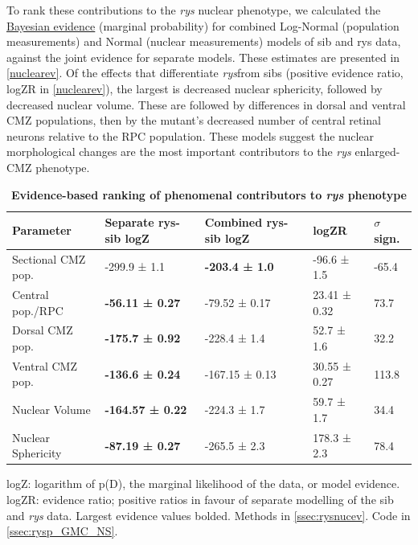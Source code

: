 \documentclass{ut-thesis}
\begin{document}
\begin{NoHyper}
To rank these contributions to the \textit{rys} nuclear phenotype, we calculated the \hyperref[ssec:BayesEpistemology]{Bayesian evidence} (marginal probability) for combined Log-Normal (population measurements) and Normal (nuclear measurements) models of sib and rys data, against the joint evidence for separate models. These estimates are presented in \autoref{nuclearev}. Of the effects that differentiate \textit{rys}from sibs (positive evidence ratio, logZR in \autoref{nuclearev}), the largest is decreased nuclear sphericity, followed by decreased nuclear volume. These are followed by differences in dorsal and ventral CMZ populations, then by the mutant's decreased number of central retinal neurons relative to the RPC population. These models suggest the nuclear morphological changes are the most important contributors to the \textit{rys} enlarged-CMZ phenotype.

\begin{table}[!ht]
    \centering
    \caption{{\bf Evidence-based ranking of phenomenal contributors to \textit{rys} phenotype}}
    \begin{tabular}{|l|l|l|l|l|} 
        \hline {\bf Parameter} & {\bf Separate rys-sib logZ} & {\bf Combined rys-sib logZ} & {\bf logZR} & {\bf $\sigma$ sign.}\\ \hline 
        Sectional CMZ pop. & -299.9 ± 1.1 & {\bf -203.4 ± 1.0} & -96.6 ± 1.5 & -65.4 \\ \hline
        Central pop./RPC  & {\bf -56.11 ± 0.27} & -79.52 ± 0.17 & 23.41 ± 0.32 & 73.7 \\ \hline 
        Dorsal CMZ pop. & {\bf -175.7 ± 0.92} & -228.4 ± 1.4 & 52.7 ± 1.6 & 32.2 \\ \hline 
        Ventral CMZ pop. & {\bf -136.6 ± 0.24} & -167.15 ± 0.13 & 30.55 ± 0.27 & 113.8 \\ \hline 
        Nuclear Volume & {\bf -164.57 ± 0.22} & -224.3 ± 1.7 & 59.7 ± 1.7 & 34.4 \\ \hline 
        Nuclear Sphericity & {\bf -87.19 ± 0.27} & -265.5 ± 2.3 & 178.3 ± 2.3 & 78.4 \\ \hline
    \end{tabular}
    \begin{flushleft}
    logZ: logarithm of p(D), the marginal likelihood of the data, or model evidence. logZR: evidence ratio; positive ratios in favour of separate modelling of the sib and \textit{rys} 
    data. Largest evidence values bolded.
    Methods in \autoref{ssec:rysnucev}.
    Code in \autoref{ssec:rysp_GMC_NS}.
    \end{flushleft}
    \label{nuclearev}
\end{table}


\end{NoHyper}
\end{document}
